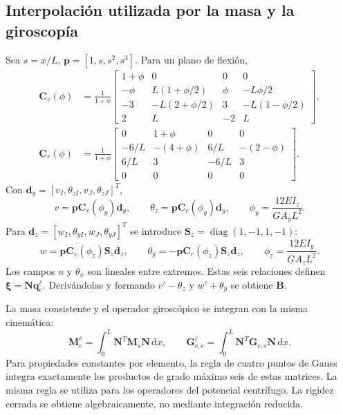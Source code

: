 \documentclass[oneside,a4paper,spanish,links,pagenumbers]{amca}
\newcommand{\dd}{\mathrm{d}}
\newcommand{\diag}{\operatorname{diag}}
\begin{document}
\subsection{Interpolación utilizada por la masa y la giroscopía}
Sea $s=x/L$, $\bm p=[1,s,s^2,s^3]$. Para un plano de flexión,
\begin{align}
\bm C_v(\phi)&=\frac{1}{1+\phi}
\begin{bmatrix}
1+\phi&0&0&0\\
-\phi&L(1+\phi/2)&\phi&-L\phi/2\\
-3&-L(2+\phi/2)&3&-L(1-\phi/2)\\
2&L&-2&L
\end{bmatrix},\\
\bm C_r(\phi)&=\frac{1}{1+\phi}
\begin{bmatrix}
0&1+\phi&0&0\\
-6/L&-(4+\phi)&6/L&-(2-\phi)\\
6/L&3&-6/L&3\\0&0&0&0
\end{bmatrix}.
\end{align}
Con $\bm d_y=[v_I,\theta_{zI},v_J,\theta_{zJ}]^T$,
\begin{equation}
v=\bm p\bm C_v(\phi_y)\bm d_y,
\qquad \theta_z=\bm p\bm C_r(\phi_y)\bm d_y,
\qquad \phi_y=\frac{12EI_z}{GA_yL^2}.
\end{equation}
Para $\bm d_z=[w_I,\theta_{yI},w_J,\theta_{yJ}]^T$ se introduce $\bm S_z=\diag(1,-1,1,-1)$:
\begin{equation}
w=\bm p\bm C_v(\phi_z)\bm S_z\bm d_z,
\qquad\theta_y=-\bm p\bm C_r(\phi_z)\bm S_z\bm d_z,
\qquad\phi_z=\frac{12EI_y}{GA_zL^2}.
\end{equation}
Los campos $u$ y $\theta_x$ son lineales entre extremos. Estas seis relaciones definen $\bm\xi=\bm N\bm q_e^\ell$. Derivándolas y formando $v'-\theta_z$ y $w'+\theta_y$ se obtiene $\bm B$.

La masa consistente y el operador giroscópico se integran con la misma cinemática:
\begin{equation}
\bm M_e^\ell=\int_0^L\bm N^T\bm M_s\bm N\,\dd x,
\qquad
\bm G_{c,e}^\ell=\int_0^L\bm N^T\bm G_{c,s}\bm N\,\dd x.
\end{equation}
Para propiedades constantes por elemento, la regla de cuatro puntos de Gauss integra exactamente los productos de grado máximo seis de estas matrices. La misma regla se utiliza para los operadores del potencial centrífugo. La rigidez cerrada se obtiene algebraicamente, no mediante integración reducida.
\end{document}
